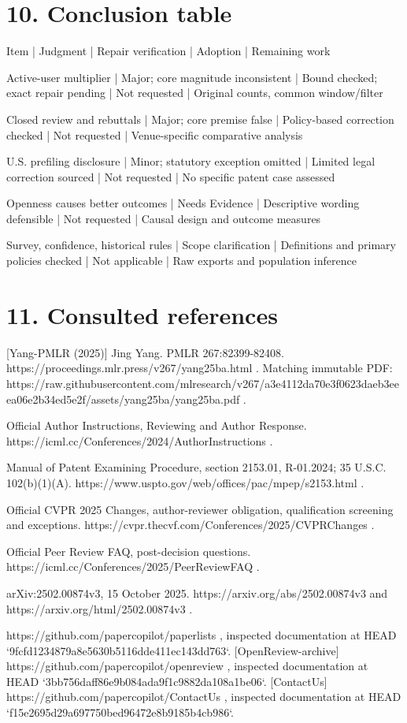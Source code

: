 \documentclass[10pt]{article}
\begin{document}
\section*{10. Conclusion table}
Item | Judgment | Repair verification | Adoption | Remaining work\par
Active-user multiplier | Major; core magnitude inconsistent | Bound checked; exact repair pending | Not requested | Original counts, common window/filter\par
Closed review and rebuttals | Major; core premise false | Policy-based correction checked | Not requested | Venue-specific comparative analysis\par
U.S. prefiling disclosure | Minor; statutory exception omitted | Limited legal correction sourced | Not requested | No specific patent case assessed\par
Openness causes better outcomes | Needs Evidence | Descriptive wording defensible | Not requested | Causal design and outcome measures\par
Survey, confidence, historical rules | Scope clarification | Definitions and primary policies checked | Not applicable | Raw exports and population inference\par
\section*{11. Consulted references}
[Yang-PMLR (2025)] Jing Yang. PMLR 267:82399-82408. https://proceedings.mlr.press/v267/yang25ba.html . Matching immutable PDF: https://raw.githubusercontent.com/mlresearch/v267/a3e4112da70e3f0623daeb3eeea06e2b34ed5e2f/assets/yang25ba/yang25ba.pdf .\par
[ICML-2024] Official Author Instructions, Reviewing and Author Response. https://icml.cc/Conferences/2024/AuthorInstructions .\par
[USPTO-2153.01 (2024)] Manual of Patent Examining Procedure, section 2153.01, R-01.2024; 35 U.S.C. 102(b)(1)(A). https://www.uspto.gov/web/offices/pac/mpep/s2153.html .\par
[CVPR-2025] Official CVPR 2025 Changes, author-reviewer obligation, qualification screening and exceptions. https://cvpr.thecvf.com/Conferences/2025/CVPRChanges .\par
[ICML-2025-FAQ] Official Peer Review FAQ, post-decision questions. https://icml.cc/Conferences/2025/PeerReviewFAQ .\par
[Yang-arXiv-v3] arXiv:2502.00874v3, 15 October 2025. https://arxiv.org/abs/2502.00874v3 and https://arxiv.org/html/2502.00874v3 .\par
[Paperlists] https://github.com/papercopilot/paperlists , inspected documentation at HEAD `9fcfd1234879a8e5630b5116dde411ec143dd763`. [OpenReview-archive] https://github.com/papercopilot/openreview , inspected documentation at HEAD `3bb756daff86e9b084ada9f1c9882da108a1be06`. [ContactUs] https://github.com/papercopilot/ContactUs , inspected documentation at HEAD `f15e2695d29a697750bed96472e8b9185b4cb986`.\par
\end{document}
